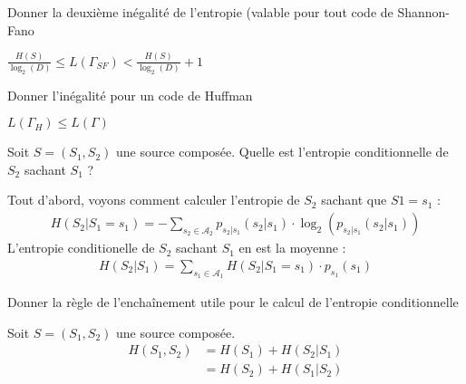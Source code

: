 \documentclass[12pt]{article}
\newcommand*{\xfield}[1]{\begin{mdframed}\centering #1\end{mdframed}\bigskip}
\newenvironment{note}{}{}
\begin{document}
\begin{note}
\xfield{Donner la deuxième inégalité de l'entropie (valable pour tout code de Shannon-Fano}
\xfield{$\frac{H(S)}{\log_2(D)} \le L(\Gamma_{SF}) < \frac{H(S)}{\log_2(D)} + 1$}
\end{note}

\begin{note}
	\xfield{Donner l'inégalité pour un code de Huffman}
	\xfield{$L(\Gamma_H) \le L(\Gamma)$}
\end{note}

\begin{note}
	\xfield{Soit $S=(S_1,S_2)$ une source composée. Quelle est l'entropie conditionnelle de $S_2$ sachant $S_1$ ?}
	\xfield{Tout d'abord, voyons comment calculer l'entropie de $S_2$ sachant que $S1=s_1$ : \begin{align*}
	H(S_2|S_1 = s_1) = - \sum\limits_{s_2 \in \mathcal{A}_2} p_{s_2|s_1}(s_2|s_1) \cdot \log_2(p_{s_2|s_1}(s_2|s_1))
	\end{align*}
	L'entropie conditionelle de $S_2$ sachant $S_1$ en est la moyenne :
	\begin{align*}
	H(S_2|S_1)= \sum\limits_{s_1 \in \mathcal{A}_1} H(S_2|S_1=s_1) \cdot p_{s_1}(s_1)
	\end{align*}}
\end{note}

\begin{note}
\xfield{Donner la règle de l'enchaînement utile pour le calcul de l'entropie conditionnelle}
\xfield{Soit $S=(S_1,S_2)$ une source composée. \begin{align*}
	H(S_1,S_2) &= H(S_1) + H(S_2|S_1)\\
	&= H(S_2) + H(S_1|S_2)
\end{align*}}
\end{note}
\end{document}
